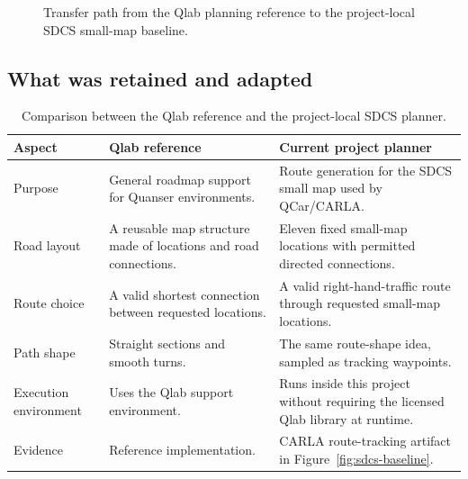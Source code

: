\documentclass[11pt,a4paper]{article}
\begin{document}
\begin{figure}[H]
\centering
{}
\caption{Transfer path from the Qlab planning reference to the project-local SDCS small-map baseline.}
\label{fig:qlab-transfer}
\end{figure}

\subsection{What was retained and adapted}
\begin{table}[H]
\centering\tiny
\setlength{\tabcolsep}{2pt}
\begin{tabular}{@{}p{1.3cm}p{3.1cm}p{3.1cm}@{}}
\toprule
\textbf{Aspect} & \textbf{Qlab reference} & \textbf{Current project planner}\\
\midrule
Purpose & General roadmap support for Quanser environments. & Route generation for the SDCS small map used by QCar/CARLA.\\
Road layout & A reusable map structure made of locations and road connections. & Eleven fixed small-map locations with permitted directed connections.\\
Route choice & A valid shortest connection between requested locations. & A valid right-hand-traffic route through requested small-map locations.\\
Path shape & Straight sections and smooth turns. & The same route-shape idea, sampled as tracking waypoints.\\
Execution environment & Uses the Qlab support environment. & Runs inside this project without requiring the licensed Qlab library at runtime.\\
Evidence & Reference implementation. & CARLA route-tracking artifact in Figure~\ref{fig:sdcs-baseline}.\\
\bottomrule
\end{tabular}
\caption{Comparison between the Qlab reference and the project-local SDCS planner.}
\label{tab:qlab-comparison}
\end{table}
\end{document}
